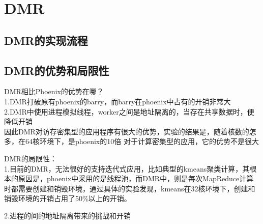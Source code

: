 \section{DMR}
\subsection{DMR的实现流程}

\subsection{DMR的优势和局限性}
DMR相比Phoenix的优势在哪？\\
1.DMR打破原有phoenix的barry，而barry在phoenix中占有的开销非常大\\
2.DMR中使用进程模拟线程，worker之间是地址隔离的，当存在共享数据时，便降低开销\\
因此DMR对访存密集型的应用程序有很大的优势，实验的结果是，随着核数的怎多，在64核环境下，是phoenix的10倍
对于计算密集型的应用，它的优势不是很大

DMR的局限性：\\
1.目前的DMR，无法很好的支持迭代式应用，比如典型的kmeans聚类计算，其根本的原因是，phoenix中采用的是线程池，而DMR中，则是每次MapReduce计算时都需要创建和销毁环境，通过具体的实验发现，kmeans在32核环境下，创建和销毁环境的开销占用了50\%以上的开销。

2.进程的间的地址隔离带来的挑战和开销
